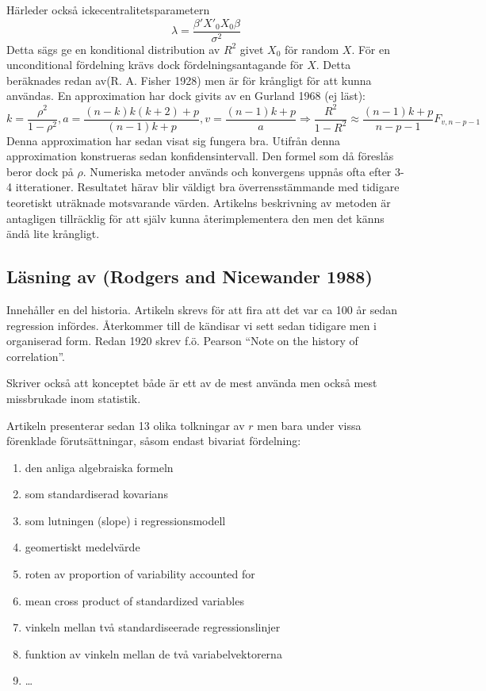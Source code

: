 \documentclass[]{article}
\providecommand{\tightlist}{%
  \setlength{\itemsep}{0pt}\setlength{\parskip}{0pt}}
\begin{document}
Härleder också ickecentralitetsparametern
\[\lambda = \frac{\beta'X'_0X_0\beta}{\sigma^2}\] Detta sägs ge en
konditional distribution av \(R^2\) givet \(X_0\) för random \(X\). För
en unconditional fördelning krävs dock fördelningsantagande för \(X\).
Detta beräknades redan av(R. A. Fisher 1928) men är för krångligt för
att kunna användas. En approximation har dock givits av en Gurland 1968
(ej läst):
\[k = \frac{\rho^2}{1-\rho^2}, a = \frac{(n-k)k(k+2) + p}{(n-1)k +p}, v = \frac{(n-1)k+p}{a}\Rightarrow \frac{R^2}{1-R^2} \approx \frac{(n-1)k +p}{n-p-1}F_{v, n-p-1}\]
Denna approximation har sedan visat sig fungera bra. Utifrån denna
approximation konstrueras sedan konfidensintervall. Den formel som då
föreslås beror dock på \(\rho\). Numeriska metoder används och
konvergens uppnås ofta efter 3-4 itterationer. Resultatet härav blir
väldigt bra överrensstämmande med tidigare teoretiskt uträknade
motsvarande värden. Artikelns beskrivning av metoden är antagligen
tillräcklig för att själv kunna återimplementera den men det känns ändå
lite krångligt.

\subsection{Läsning av (Rodgers and Nicewander
1988)}\label{lasning-av-rodgers1988}

Innehåller en del historia. Artikeln skrevs för att fira att det var ca
100 år sedan regression infördes. Återkommer till de kändisar vi sett
sedan tidigare men i organiserad form. Redan 1920 skrev f.ö. Pearson
``Note on the history of correlation''.

Skriver också att konceptet både är ett av de mest använda men också
mest missbrukade inom statistik.

Artikeln presenterar sedan 13 olika tolkningar av \(r\) men bara under
vissa förenklade förutsättningar, såsom endast bivariat fördelning:

\begin{enumerate}
\def\labelenumi{\arabic{enumi}.}
\tightlist
\item
  den anliga algebraiska formeln
\item
  som standardiserad kovarians
\item
  som lutningen (slope) i regressionsmodell
\item
  geomertiskt medelvärde
\item
  roten av proportion of variability accounted for
\item
  mean cross product of standardized variables
\item
  vinkeln mellan två standardiseerade regressionslinjer
\item
  funktion av vinkeln mellan de två variabelvektorerna
\item
  \ldots{}
\end{enumerate}
\end{document}
